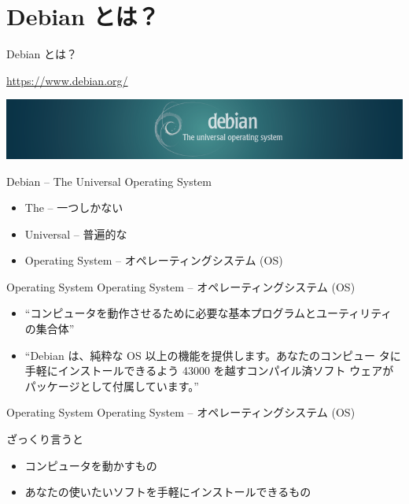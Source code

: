 \section{Debian とは？}
\begin{frame}{Debian とは？}

 \pause
 \url{https://www.debian.org/}

 \pause
 \begin{center} 
  \includegraphics[width=\hsize]{image201606/banner.png}
 \end{center}

 \pause
 Debian -- The Universal Operating System\pause
\begin{itemize}[<+->]
 \item The \pause -- 一つしかない\pause
 \item Universal \pause -- 普遍的な\pause
 \item Operating System \pause -- オペレーティングシステム (OS)
\end{itemize}
 
\end{frame}

\begin{frame}{Operating System}
 Operating System -- オペレーティングシステム (OS)\pause

 \begin{itemize}
  \item “コンピュータを動作させるために必要な基本プログラムとユーティリティ
	の集合体”\pause
  \item “Debian は、純粋な OS 以上の機能を提供します。あなたのコンピュー
	タに手軽にインストールできるよう 43000 を越すコンパイル済ソフト
	ウェアが パッケージとして付属しています。”
 \end{itemize}

\end{frame}

\begin{frame}{Operating System}
 Operating System -- オペレーティングシステム (OS)

 ざっくり言うと
 \begin{itemize}
  \item コンピュータを動かすもの
  \item あなたの使いたいソフトを手軽にインストールできるもの
 \end{itemize}

\end{frame}

